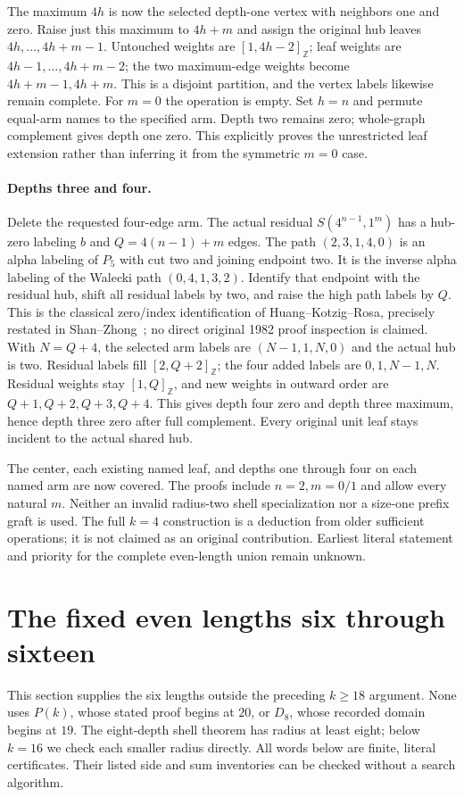 \documentclass[11pt,a4paper]{article}
\theoremstyle{definition}\newtheorem{definition}[theorem]{Definition}
\theoremstyle{remark}\newtheorem{remark}[theorem]{Remark}
\newcommand{\ints}[2]{[#1,#2]_{\mathbb Z}}
\begin{document}
The maximum $4h$ is now the selected depth-one vertex with neighbors
one and zero. Raise just this maximum to $4h+m$ and assign the
original hub leaves $4h,\ldots,4h+m-1$. Untouched weights are
$\ints1{4h-2}$; leaf weights are $4h-1,\ldots,4h+m-2$; the two
maximum-edge weights become $4h+m-1,4h+m$. This is a disjoint
partition, and the vertex labels likewise remain complete. For $m=0$
the operation is empty. Set $h=n$ and permute equal-arm names to
the specified arm. Depth two remains zero; whole-graph complement
gives depth one zero. This explicitly proves the unrestricted
leaf extension rather than inferring it from the symmetric $m=0$ case.

\paragraph{Depths three and four.}
Delete the requested four-edge arm. The actual residual
$S(4^{n-1},1^m)$ has a hub-zero labeling $b$ and
$Q=4(n-1)+m$ edges. The path $(2,3,1,4,0)$ is an alpha labeling
of $P_5$ with cut two and joining endpoint two. It is the inverse
alpha labeling of the Walecki path $(0,4,1,3,2)$.
Identify that endpoint with the residual hub, shift all residual
labels by two, and raise the high path labels by $Q$. This is the
classical zero/index identification of Huang--Kotzig--Rosa, precisely
restated in Shan--Zhong~\cite[Lemma 1]{sz}; no direct original 1982
proof inspection is claimed. With $N=Q+4$, the selected arm labels
are $(N-1,1,N,0)$ and the actual hub is two. Residual labels fill
$\ints2{Q+2}$; the four added labels are $0,1,N-1,N$.
Residual weights stay $\ints1Q$, and new weights in outward order
are $Q+1,Q+2,Q+3,Q+4$. This gives depth four zero and depth three
maximum, hence depth three zero after full complement. Every original
unit leaf stays incident to the actual shared hub.

The center, each existing named leaf, and depths one through four
on each named arm are now covered. The proofs include $n=2,m=0/1$
and allow every natural $m$. Neither an invalid radius-two shell
specialization nor a size-one prefix graft is used. The full $k=4$
construction is a deduction from older sufficient operations; it is
not claimed as an original contribution. Earliest literal statement
and priority for the complete even-length union remain unknown.

\section{The fixed even lengths six through sixteen}\label{sec:below18}
This section supplies the six lengths outside the preceding $k\ge18$
argument. None uses $P(k)$, whose stated proof begins at $20$, or $D_8$,
whose recorded domain begins at $19$. The eight-depth shell theorem has
radius at least eight; below $k=16$ we check each smaller radius directly.
All words below are finite, literal certificates. Their listed side and
sum inventories can be checked without a search algorithm.
\end{document}
